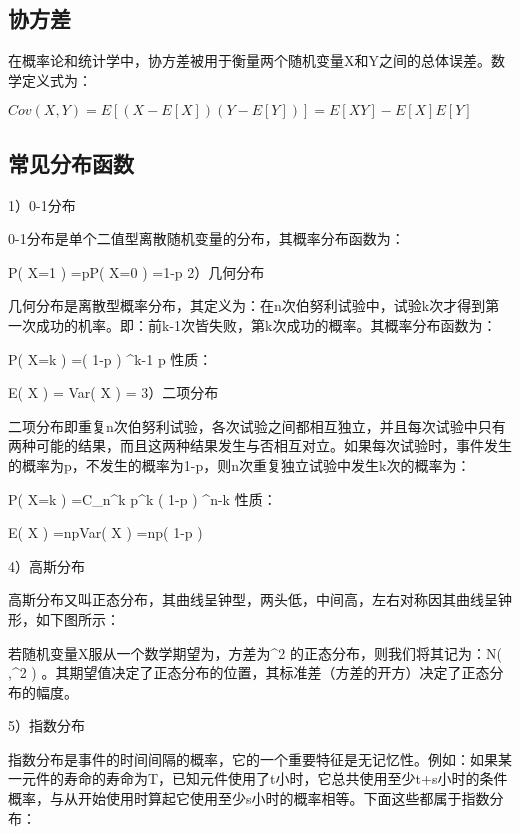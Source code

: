 \documentclass[11pt]{book}
\newcounter{#2}
\newcounter{#2}[#1]
\numberwithin{#2}{#1}
\begin{document}
\subsection{协方差}

在概率论和统计学中，协方差被用于衡量两个随机变量X和Y之间的总体误差。数学定义式为：

$ Cov\left( X,Y \right) =E\left[ \left( X-E\left[ X \right]  \right) \left( Y-E\left[ Y \right]  \right) \right] =E\left[ XY \right] -E\left[ X \right] E\left[ Y \right] $ 

\subsection{常见分布函数}

1）0-1分布

0-1分布是单个二值型离散随机变量的分布，其概率分布函数为：

P\left( X=1 \right) =pP\left( X=0 \right) =1-p
2）几何分布

几何分布是离散型概率分布，其定义为：在n次伯努利试验中，试验k次才得到第一次成功的机率。即：前k-1次皆失败，第k次成功的概率。其概率分布函数为：

P\left( X=k \right) =\left( 1-p \right) ^{k-1} p
性质：

E\left( X \right) = Var\left( X \right) = 
3）二项分布

二项分布即重复n次伯努利试验，各次试验之间都相互独立，并且每次试验中只有两种可能的结果，而且这两种结果发生与否相互对立。如果每次试验时，事件发生的概率为p，不发生的概率为1-p，则n次重复独立试验中发生k次的概率为：

P\left( X=k \right) =C_{n}^{k} p^{k} \left( 1-p \right) ^{n-k} 
性质：

E\left( X \right) =npVar\left( X \right) =np\left( 1-p \right) 

4）高斯分布

高斯分布又叫正态分布，其曲线呈钟型，两头低，中间高，左右对称因其曲线呈钟形，如下图所示：


若随机变量X服从一个数学期望为\mu ，方差为\sigma ^{2} 的正态分布，则我们将其记为：N\left( \mu ,\sigma^{2}  \right) 。其期望值\mu 决定了正态分布的位置，其标准差\sigma （方差的开方）决定了正态分布的幅度。

5）指数分布

指数分布是事件的时间间隔的概率，它的一个重要特征是无记忆性。例如：如果某一元件的寿命的寿命为T，已知元件使用了t小时，它总共使用至少t+s小时的条件概率，与从开始使用时算起它使用至少s小时的概率相等。下面这些都属于指数分布：
\end{document}
